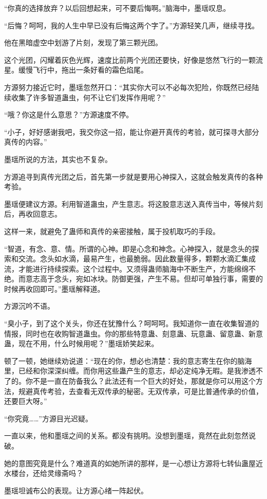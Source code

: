 \begin{this_body}
“你真的选择放弃？以后回想起来，可不要后悔啊。”脑海中，墨瑶叹息。

“后悔？呵呵，我的人生中早已没有后悔这两个字了。”方源轻笑几声，继续寻找。

他在黑暗虚空中划游了片刻，发现了第三颗光团。

这个光团，闪耀着灰色光辉，速度比前两个光团还要快，好像是悠然飞行的一颗流星。缓慢飞行中，拖出一条好看的霜色焰尾。

方源努力接近它时，墨瑶忽然开口：“其实你大可以不必每次犯险，你既然已经陆续收集了许多智道蛊虫，何不让它们发挥作用呢？”

“哦？你这是什么意思？”方源速度不停。

“小子，好好感谢我吧，我交你这一招，能让你避开真传的考验，就可探寻大部分真传的内容。”

墨瑶所说的方法，其实也不复杂。

方源追寻到真传光团之后，首先第一步就是要用心神探入，这就会触发真传的各种考验。

墨瑶便建议方源。利用智道蛊虫，产生意志。将这股意志送入真传当中，等候片刻后，再收回意志。

这样一来，就避免了蛊师和真传的亲密接触，属于投机取巧的手段。

“智道，有念、意、情。所谓的心神。即是心念和神念。心神探入，就是念头的探索和交流。念头如水滴，最易产生，也最脆弱。因此数量得多，颗颗水滴汇集成流，才能进行持续探索。这个过程中。又须得蛊师脑海中不断生产，方能绵绵不绝。而意志高于念头，宛如冰块。防御更强，产生不易。但却可单独行事，需要的时候再收回即可。”墨瑶解释道。

方源沉吟不语。

“臭小子，到了这个关头，你还在犹豫什么？呵呵呵。我知道你一直在收集智道的情报，同时也在收购智道蛊虫。你的那些特意蛊、刻意蛊、玩意蛊、留意蛊、新意蛊，现在不用，什么时候用呢？”墨瑶娇笑起来。

顿了一顿，她继续劝说道：“现在的你，想必也清楚：我的意志寄生在你的脑海里，已经和你深深纠缠。而你用这些蛊产生的意志，却必定纯净无暇。是我渗透不了的。你不是一直在防备我么？此法还有一个巨大的好处，那就是你可以用这个方法，规避真传考验，去查看无双传承的秘密。无双传承，可是比普通传承的价值，还要巨大呀。”

“你究竟……”方源目光迟疑。

一直以来，他和墨瑶之间的关系。都没有挑明。没想到墨瑶，竟然在此刻忽然说破。

她的意图究竟是什么？难道真的如她所讲的那样，是一心想让方源将七转仙蛊屋近水楼台，还给灵缘斋吗？

墨瑶坦诚布公的表现。让方源心绪一阵起伏。


\end{this_body}
